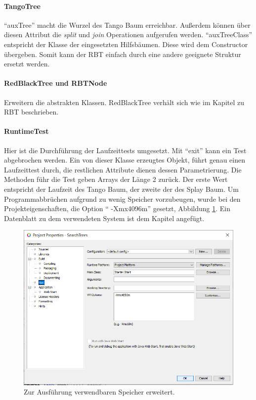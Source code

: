 \documentclass[a4paper,12pt]{article}
\begin{document}
\paragraph{TangoTree}
\enquote{auxTree} macht die Wurzel des Tango Baum erreichbar. Außerdem können über diesen Attribut die \textit{split} und \textit{join} Operationen aufgerufen werden. \enquote{auxTreeClass} entspricht der Klasse der eingesetzten Hilfsbäumen. Diese wird dem Constructor übergeben. Somit kann der RBT einfach durch eine andere geeignete Struktur ersetzt werden.

\paragraph{RedBlackTree und RBTNode}
Erweitern die abstrakten Klassen. RedBlackTree verhält sich wie im Kapitel zu RBT beschrieben.

\paragraph{RuntimeTest}
Hier ist die Durchführung der Laufzeittests umgesetzt. Mit \enquote{exit} kann ein Test abgebrochen werden. Ein von dieser Klasse erzeugtes Objekt, führt genau einen Laufzeittest durch, die restlichen Attribute dienen dessen Parametrierung. Die Methoden führ die Test geben Arrays der Länge 2 zurück. Der erste Wert entspricht der Laufzeit des Tango Baum, der zweite der des Splay Baum. Um Programmabbrüchen aufgrund zu wenig Speicher vorzubeugen, wurde bei den Projekteigenschaften, die Option \enquote{ -Xmx4096m} gesetzt, Abbildung \ref{fig:optionSpeicher}. Ein Datenblatt zu dem verwendeten System ist dem Kapitel angefügt.

\begin{figure}[H]
	\centering
	\includegraphics[width=1\textwidth]{"Medien/laufzeittest/optionSpeicher"}
	\caption{Zur Ausführung verwendbaren Speicher erweitert.}
	\label{fig:optionSpeicher}
\end{figure}
\end{document}
